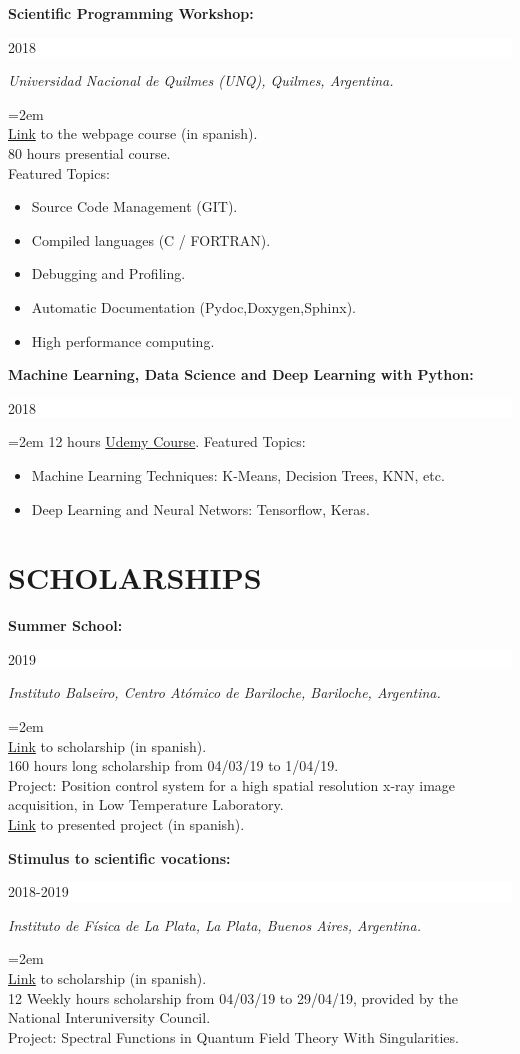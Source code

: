 \documentclass[paper=letter,fontsize=11pt]{scrartcl} %
\newcommand{\sepspace}{\vspace*{1em}}		%
\newcommand{\NewPart}[2]{\section*{\uppercase{#1} \small \normalfont #2}}
\newcommand{\EducationEntry}[4]{
		\noindent \textbf{#1} \hfill      %
		\colorbox{White}{%
			\parbox{6em}{%
			\hfill\color{Black}#2}} \par  %
		\noindent \textit{#3} \par        %
		\noindent\hangindent=2em\hangafter=0 \small #4 %
		\normalsize \par}
\begin{document}
\EducationEntry{Scientific Programming Workshop:
}{2018}{Universidad Nacional de Quilmes (UNQ), Quilmes, Argentina.}{\\
{\href{https://wtpc.github.io/}{Link}} to the webpage course (in spanish).\\
80 hours presential course.\\
Featured Topics:



\begin{itemize}
	\item{Source Code Management (GIT).}
	\item{Compiled languages (C / FORTRAN).}
	\item{Debugging and Profiling.}
	\item{Automatic Documentation (Pydoc,Doxygen,Sphinx).}
	\item{High performance computing.}
	\end{itemize}}
\sepspace

\EducationEntry{Machine Learning, Data Science and Deep Learning with Python:
}{2018}{}{
12 hours {\href{https://www.udemy.com/data-science-and-machine-learning-with-python-hands-on/}{Udemy Course}}.
Featured Topics:
\begin{itemize}
\item{Machine Learning Techniques: K-Means, Decision Trees, KNN, etc. }
\item{Deep Learning and Neural Networs: Tensorflow, Keras.}
\end{itemize}
}


\sepspace

\NewPart{Scholarships}{}

\EducationEntry{Summer School:}
{2019}
{Instituto Balseiro, Centro Atómico de Bariloche, Bariloche, Argentina.}{\\
{\href{http://www.ib.edu.ar/component/k2/item/452-becas-de-verano.html}{Link}} to scholarship (in spanish).
\\ 160 hours long scholarship from 04/03/19 to 1/04/19. \\ 
Project: Position control system for a high spatial resolution x-ray image acquisition, in Low Temperature Laboratory.\\
{\href{https://drive.google.com/drive/folders/1y01BjDnIPS2QOX3Vo68r9A8HA9tstj1S}{Link}} to presented project (in spanish).
}

\sepspace

\EducationEntry{Stimulus to scientific vocations:}
{2018-2019}
{Instituto de Física de La Plata, La Plata, Buenos Aires, Argentina.}
{\\
{\href{http://evc.cin.edu.ar/}{Link}} to scholarship (in spanish).
\\ 12 Weekly hours scholarship from 04/03/19 to 29/04/19, provided by the National Interuniversity Council. \\ 
Project: Spectral Functions in Quantum Field Theory With Singularities.
}
\end{document}
